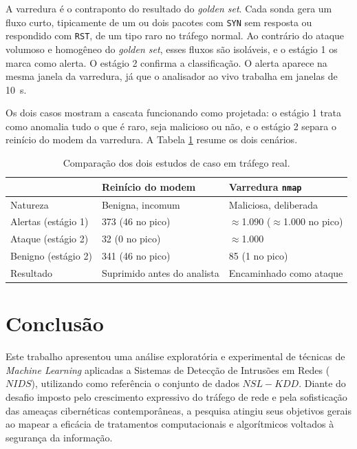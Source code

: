 \documentclass[a4paper,10pt, twocolumn]{article}
\begin{document}
A varredura é o contraponto do resultado do \textit{golden set}. Cada sonda gera um
fluxo curto, tipicamente de um ou dois pacotes com \texttt{SYN} sem resposta ou
respondido com \texttt{RST}, de um tipo raro no tráfego normal. Ao contrário do ataque volumoso e
homogêneo do \textit{golden set}, esses fluxos são isoláveis, e o estágio 1 os marca
como alerta. O estágio 2 confirma a classificação. O alerta aparece na mesma janela
da varredura, já que o analisador ao vivo trabalha em janelas de 10~s.

Os dois casos mostram a cascata funcionando como projetada: o estágio 1 trata como
anomalia tudo o que é raro, seja malicioso ou não, e o estágio 2 separa o reinício
do modem da varredura. A Tabela \ref{tab:casos} resume os dois cenários.

\begin{table}[H]
	\centering
	\footnotesize
	\setlength{\tabcolsep}{3pt}
	\begin{tabularx}{\columnwidth}{l X X}
		\toprule
		 & \textbf{Reinício do modem} & \textbf{Varredura \texttt{nmap}} \\
		\midrule
		Natureza          & Benigna, incomum          & Maliciosa, deliberada \\
		Alertas (estágio 1)& 373 (46 no pico)         & $\approx$1.090 ($\approx$1.000 no pico) \\
		Ataque (estágio 2) & 32 (0 no pico)           & $\approx$1.000 \\
		Benigno (estágio 2)& 341 (46 no pico)         & 85 (1 no pico) \\
		Resultado         & Suprimido antes do analista & Encaminhado como ataque \\
		\bottomrule
	\end{tabularx}
	\caption{Comparação dos dois estudos de caso em tráfego real.}
	\label{tab:casos}
\end{table}

\section{Conclusão}
Este trabalho apresentou uma análise exploratória e experimental de técnicas de \textit{Machine Learning} aplicadas a Sistemas de Detecção de Intrusões em Redes ($NIDS$), utilizando como referência o conjunto de dados $NSL-KDD$. Diante do desafio imposto pelo crescimento expressivo do tráfego de rede e pela sofisticação das ameaças cibernéticas contemporâneas, a pesquisa atingiu seus objetivos gerais ao mapear a eficácia de tratamentos computacionais e algorítmicos voltados à segurança da informação.
\end{document}
